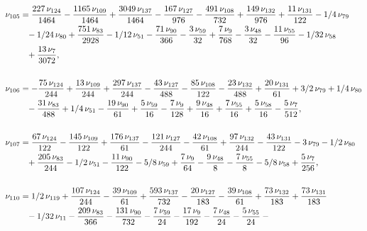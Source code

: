 \documentclass[a4paper,12pt, DIV=14, BCOR=5mm, twoside, headsepline]{scrbook}
\begin{document}
\begin{align}\label{AreaSol10}
\begin{aligned}
\nu_{{105}}&={\frac {227\,\nu_{{124}}}{1464}}-{\frac {1165
\,\nu_{{109}}}{1464}}+{\frac {3049\,\nu_{{137}}}{1464}}-{\frac {167\,
\nu_{{127}}}{976}}-{\frac {491\,\nu_{{108}}}{732}}+{\frac {149\,\nu_{{
132}}}{976}}+{\frac {11\,\nu_{{131}}}{122}}-1/4\,\nu_{{79}}\\
 &\hphantom{=}-1/24\,\nu_
{{80}}+{\frac {751\,\nu_{{83}}}{2928}}-1/12\,\nu_{{51}}-{\frac {71\,
\nu_{{90}}}{366}}-{\frac {3\,\nu_{{59}}}{32}}+{\frac {7\,\nu_{{9}}}{
768}}-{\frac {3\,\nu_{{48}}}{32}}-{\frac {11\,\nu_{{55}}}{96}}-1/32\,
\nu_{{58}}\\
 &\hphantom{=}+{\frac {13\,\nu_{{7}}}{3072}},\\
\\
\nu_{{106}}&=-{\frac {75\,\nu_
{{124}}}{244}}+{\frac {13\,\nu_{{109}}}{244}}+{\frac {297\,\nu_{{137}}
}{244}}-{\frac {43\,\nu_{{127}}}{488}}-{\frac {85\,\nu_{{108}}}{122}}-
{\frac {23\,\nu_{{132}}}{488}}+{\frac {20\,\nu_{{131}}}{61}}+3/2\,\nu_
{{79}}+1/4\,\nu_{{80}}\\
 &\hphantom{=}-{\frac {31\,\nu_{{83}}}{488}}+1/4\,\nu_{{51}}-{
\frac {19\,\nu_{{90}}}{61}}+{\frac {5\,\nu_{{59}}}{16}}-{\frac {7\,\nu
_{{9}}}{128}}+{\frac {9\,\nu_{{48}}}{16}}+{\frac {7\,\nu_{{55}}}{16}}+
{\frac {5\,\nu_{{58}}}{16}}-{\frac {5\,\nu_{{7}}}{512}}, \\
\\
\nu_{{107}}&={
\frac {67\,\nu_{{124}}}{122}}-{\frac {145\,\nu_{{109}}}{122}}+{\frac {
176\,\nu_{{137}}}{61}}-{\frac {121\,\nu_{{127}}}{244}}-{\frac {42\,\nu
_{{108}}}{61}}+{\frac {97\,\nu_{{132}}}{244}}-{\frac {43\,\nu_{{131}}
}{122}}-3\,\nu_{{79}}-1/2\,\nu_{{80}}\\
 &\hphantom{=}+{\frac {205\,\nu_{{83}}}{244}}-1
/2\,\nu_{{51}}-{\frac {11\,\nu_{{90}}}{122}}-5/8\,\nu_{{59}}+{\frac {7
\,\nu_{{9}}}{64}}-{\frac {9\,\nu_{{48}}}{8}}-{\frac {7\,\nu_{{55}}}{8}
}-5/8\,\nu_{{58}}+{\frac {5\,\nu_{{7}}}{256}}, \\
\\
\nu_{{110}}&=1/2\,\nu_{{
119}}+{\frac {107\,\nu_{{124}}}{244}}-{\frac {39\,\nu_{{109}}}{61}}+{
\frac {593\,\nu_{{137}}}{732}}-{\frac {20\,\nu_{{127}}}{183}}-{\frac {
39\,\nu_{{108}}}{61}}+{\frac {73\,\nu_{{132}}}{183}}+{\frac {73\,\nu_{
{131}}}{183}}\\
 &\hphantom{=}-1/32\,\nu_{{11}}-{\frac {209\,\nu_{{83}}}{366}}-{\frac {
131\,\nu_{{90}}}{732}}-{\frac {7\,\nu_{{59}}}{24}}-{\frac {17\,\nu_{{9
}}}{192}}-{\frac {7\,\nu_{{48}}}{24}}-{\frac {5\,\nu_{{55}}}{24}}-{
}
\end{aligned}
\end{align}
\end{document}
